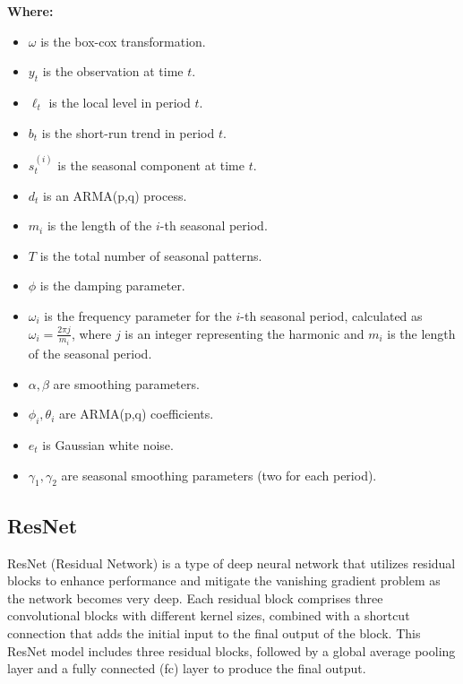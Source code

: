 \documentclass[conference]{IEEEtran}
\begin{document}
\begin{enumerate}
\textbf{Where:}
    \begin{itemize}
        \item  \({\omega}\) is the box-cox transformation.
        \item \( y_{t} \) is the observation at time \( t \).
        \item \( \ell_{t} \) is the local level in period \( t \).
        \item \( b_{t} \) is the short-run trend in period \( t \).
        \item \( s_{t}^{(i)} \) is the seasonal component at time \( t \).
        \item \( d_{t} \) is an ARMA(p,q) process.
        \item \( m_i \) is the length of the \( i \)-th seasonal period.
        \item \( T \) is the total number of seasonal patterns.
        \item \( \phi \) is the damping parameter.
        \item \( \omega_i \) is the frequency parameter for the \( i \)-th seasonal period, calculated as \( \omega_i = \frac{2 \pi j}{m_i} \), where \( j \) is an integer representing the harmonic and \( m_i \) is the length of the seasonal period.
        \item \( \alpha, \beta \) are smoothing parameters.
        \item \( \phi_i, \theta_i \) are ARMA(p,q) coefficients.
        \item \( e_{t} \) is Gaussian white noise.
        \item \( \gamma_1, \gamma_2 \) are seasonal smoothing parameters (two for each period).
    \end{itemize}
\end{enumerate}





\subsection{ResNet}  
ResNet (Residual Network) is a type of deep neural network that utilizes residual blocks to enhance performance and mitigate the vanishing gradient problem as the network becomes very deep. Each residual block comprises three convolutional blocks with different kernel sizes, combined with a shortcut connection that adds the initial input to the final output of the block. This ResNet model includes three residual blocks, followed by a global average pooling layer and a fully connected (fc) layer to produce the final output. \cite{b6}
\end{document}
